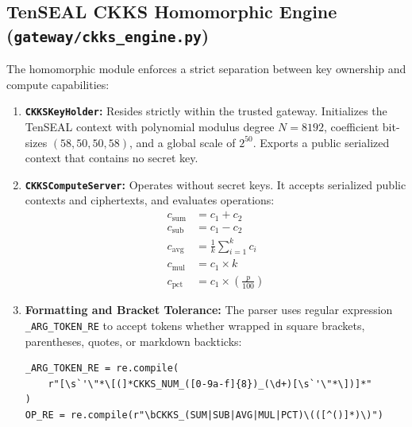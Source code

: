 \subsection{TenSEAL CKKS Homomorphic Engine (\texttt{gateway/ckks\_engine.py})}
The homomorphic module enforces a strict separation between key ownership and compute capabilities:
\begin{enumerate}[leftmargin=*]
    \item \textbf{\texttt{CKKSKeyHolder}:} Resides strictly within the trusted gateway. Initializes the TenSEAL context with polynomial modulus degree $N=8192$, coefficient bit-sizes $(58, 50, 50, 58)$, and a global scale of $2^{50}$. Exports a public serialized context that contains no secret key.
    \item \textbf{\texttt{CKKSComputeServer}:} Operates without secret keys. It accepts serialized public contexts and ciphertexts, and evaluates operations:
    \begin{align}
        c_{\text{sum}} &= c_1 + c_2 \\
        c_{\text{sub}} &= c_1 - c_2 \\
        c_{\text{avg}} &= \frac{1}{k} \sum_{i=1}^k c_i \\
        c_{\text{mul}} &= c_1 \times k \\
        c_{\text{pct}} &= c_1 \times \left(\frac{p}{100}\right)
    \end{align}
    \item \textbf{Formatting and Bracket Tolerance:} The parser uses regular expression \texttt{\_ARG\_TOKEN\_RE} to accept tokens whether wrapped in square brackets, parentheses, quotes, or markdown backticks:
    \begin{verbatim}
_ARG_TOKEN_RE = re.compile(
    r"[\s`'\"*\[(]*CKKS_NUM_([0-9a-f]{8})_(\d+)[\s`'\"*\])]*"
)
OP_RE = re.compile(r"\bCKKS_(SUM|SUB|AVG|MUL|PCT)\(([^()]*)\)")
    \end{verbatim}
\end{enumerate}

